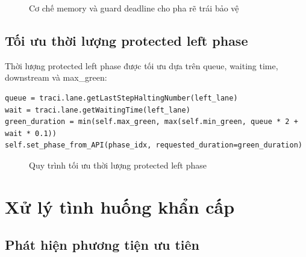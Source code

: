 \begin{figure}[H]
    \centering
    \caption{Cơ chế memory và guard deadline cho pha rẽ trái bảo vệ}
    \label{fig:protected_left_memory_diagram}
\end{figure}

\subsection{Tối ưu thời lượng protected left phase}

Thời lượng protected left phase được tối ưu dựa trên queue, waiting time, downstream và max\_green:

\begin{lstlisting}[style=py,caption={Tối ưu thời lượng protected left phase}]
queue = traci.lane.getLastStepHaltingNumber(left_lane)
wait = traci.lane.getWaitingTime(left_lane)
green_duration = min(self.max_green, max(self.min_green, queue * 2 + wait * 0.1))
self.set_phase_from_API(phase_idx, requested_duration=green_duration)
\end{lstlisting}

\begin{figure}[H]
    \centering
    \caption{Quy trình tối ưu thời lượng protected left phase}
    \label{fig:protected_left_duration_diagram}
\end{figure}

\vspace{0.5cm}



\section{Xử lý tình huống khẩn cấp}

\subsection{Phát hiện phương tiện ưu tiên}

